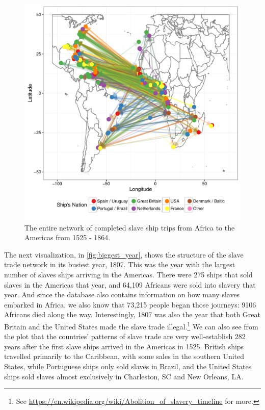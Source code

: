 \documentclass[DIV=calc, paper=a4, fontsize=10pt, twocolumn]{scrartcl}\usepackage[]{graphicx}\usepackage[]{color}
\makeatletter
\def\maxwidth{ %
  \ifdim\Gin@nat@width>\linewidth
    \linewidth
  \else
    \Gin@nat@width
  \fi
}
\newenvironment{knitrout}{}{} %
\makeatother
\begin{document}
\begin{knitrout}
\color{fgcolor}\begin{figure}[h]
\includegraphics[width=\maxwidth]{figure/whole_dataset_plot-1} \caption[The entire network of completed slave ship trips from Africa to the Americas from 1525 - 1864]{The entire network of completed slave ship trips from Africa to the Americas from 1525 - 1864.}\label{fig:whole_dataset_plot}
\end{figure}


\end{knitrout}


\par The next visualization, in \autoref{fig:biggest_year}, shows the structure of the slave trade network in its busiest year, 1807.  This was the year with the largest number of slaves ships arriving in the Americas.  There were 275 ships that sold slaves in the Americas that year, and 64,109 Africans were sold into slavery that year. And since the database also contains information on how many slaves embarked in Africa, we also know that 73,215 people began those journeys: 9106 Africans died along the way. Interestingly, 1807 was also the year that both Great Britain and the United States made the slave trade illegal.\footnote{See \url{https://en.wikipedia.org/wiki/Abolition_of_slavery_timeline} for more.} We can also see from the plot that the countries' patterns of slave trade are very well-establish 282 years after the first slave ships arrived in the Americas in 1525. British ships travelled primarily to the Caribbean, with some sales in the southern United States, while Portuguese ships only sold slaves in Brazil, and the United States ships sold slaves almost exclusively in Charleston, SC and New Orleans, LA. 
\end{document}
